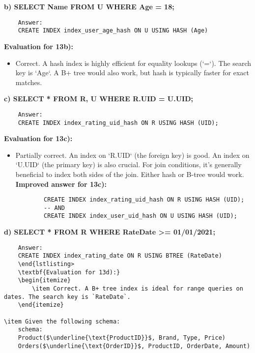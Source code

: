 \documentclass{article}
\begin{document}
\begin{enumerate}[label=\textbf{Question \arabic*.}]
    \textbf{b) SELECT Name FROM U WHERE Age = 18;}
    \begin{lstlisting}
    Answer:
    CREATE INDEX index_user_age_hash ON U USING HASH (Age)
    \end{lstlisting}
    \textbf{Evaluation for 13b):}
    \begin{itemize}
        \item Correct. A hash index is highly efficient for equality lookups (`=`). The search key is `Age`. A B+ tree would also work, but hash is typically faster for exact matches.
    \end{itemize}

    \textbf{c) SELECT * FROM R, U WHERE R.UID = U.UID;}
    \begin{lstlisting}
    Answer:
    CREATE INDEX index_rating_uid_hash ON R USING HASH (UID);
    \end{lstlisting}
    \textbf{Evaluation for 13c):}
    \begin{itemize}
        \item Partially correct. An index on `R.UID` (the foreign key) is good. An index on `U.UID` (the primary key) is also crucial. For join conditions, it's generally beneficial to index both sides of the join. Either hash or B-tree would work.
        \textbf{Improved answer for 13c):}
        \begin{lstlisting}
        CREATE INDEX index_rating_uid_hash ON R USING HASH (UID);
        -- AND
        CREATE INDEX index_user_uid_hash ON U USING HASH (UID);
        \end{lstlisting}
    \end{itemize}

    \textbf{d) SELECT * FROM R WHERE RateDate >= 01/01/2021;}
    \begin{lstlisting}
    Answer:
    CREATE INDEX index_rating_date ON R USING BTREE (RateDate)
    \end{lstlisting>
    \textbf{Evaluation for 13d):}
    \begin{itemize}
        \item Correct. A B+ tree index is ideal for range queries on dates. The search key is `RateDate`.
    \end{itemize}

\item Given the following schema:
    schema:
    Product($\underline{\text{ProductID}}$, Brand, Type, Price)
    Orders($\underline{\text{OrderID}}$, ProductID, OrderDate, Amount)


\end{lstlisting}
\end{enumerate}
\end{document}
